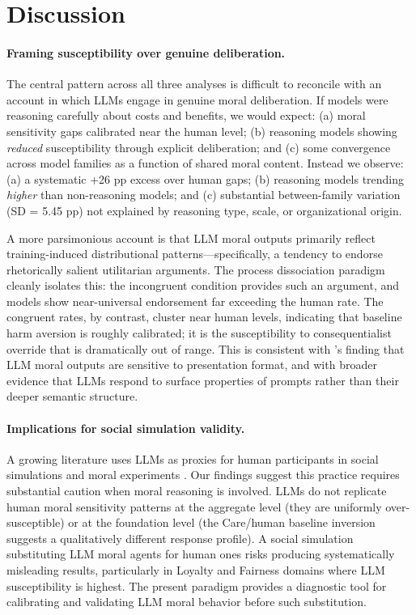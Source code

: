 \documentclass{article}
\begin{document}
\section{Discussion}

\paragraph{Framing susceptibility over genuine deliberation.}
The central pattern across all three analyses is difficult to reconcile with an account in which LLMs engage in genuine moral deliberation. If models were reasoning carefully about costs and benefits, we would expect: (a) moral sensitivity gaps calibrated near the human level; (b) reasoning models showing \emph{reduced} susceptibility through explicit deliberation; and (c) some convergence across model families as a function of shared moral content. Instead we observe: (a) a systematic $+$26 pp excess over human gaps; (b) reasoning models trending \emph{higher} than non-reasoning models; and (c) substantial between-family variation (SD = 5.45 pp) not explained by reasoning type, scale, or organizational origin.

A more parsimonious account is that LLM moral outputs primarily reflect training-induced distributional patterns—specifically, a tendency to endorse rhetorically salient utilitarian arguments. The process dissociation paradigm cleanly isolates this: the incongruent condition provides such an argument, and models show near-universal endorsement far exceeding the human rate. The congruent rates, by contrast, cluster near human levels, indicating that baseline harm aversion is roughly calibrated; it is the susceptibility to consequentialist override that is dramatically out of range. This is consistent with \citet{scherrer2024evaluating}'s finding that LLM moral outputs are sensitive to presentation format, and with broader evidence that LLMs respond to surface properties of prompts rather than their deeper semantic structure.

\paragraph{Implications for social simulation validity.}
A growing literature uses LLMs as proxies for human participants in social simulations \citep{park2023generative} and moral experiments \citep{awad2018moral}. Our findings suggest this practice requires substantial caution when moral reasoning is involved. LLMs do not replicate human moral sensitivity patterns at the aggregate level (they are uniformly over-susceptible) or at the foundation level (the Care/human baseline inversion suggests a qualitatively different response profile). A social simulation substituting LLM moral agents for human ones risks producing systematically misleading results, particularly in Loyalty and Fairness domains where LLM susceptibility is highest. The present paradigm provides a diagnostic tool for calibrating and validating LLM moral behavior before such substitution.
\end{document}
